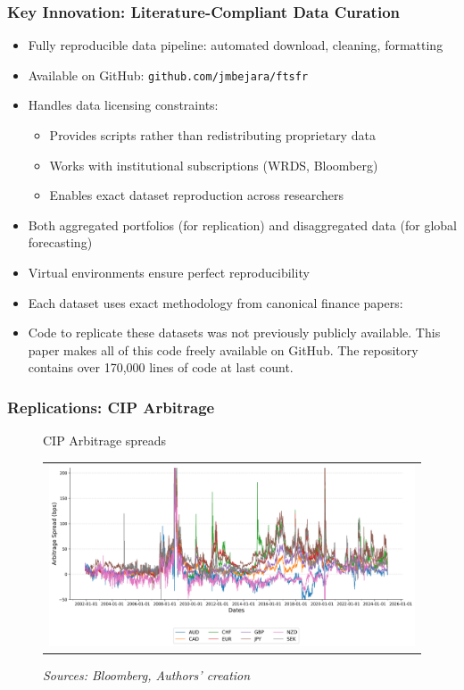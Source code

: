 \documentclass[ignorenonframetext, 9pt]{beamer}
\begin{document}
 \begin{frame}
    \frametitle{Key Innovation: Literature-Compliant Data Curation}
    \begin{itemize}
    \item \alert{Fully reproducible} data pipeline: automated download, cleaning, formatting
    \item Available on GitHub: \texttt{github.com/jmbejara/ftsfr}
    \item Handles data licensing constraints:
    \begin{itemize}
        \item Provides scripts rather than redistributing proprietary data
        \item Works with institutional subscriptions (WRDS, Bloomberg)
        \item Enables exact dataset reproduction across researchers
    \end{itemize}
    \item Both \alert{aggregated portfolios} (for replication) and \alert{disaggregated data} (for global forecasting)
    \item Virtual environments ensure perfect reproducibility
    \item Each dataset uses exact methodology from canonical finance papers:
    \item Code to replicate these datasets was not previously publicly available. This paper makes all of this
    code freely available on GitHub. The repository contains over 170,000 lines of code at last count.
    \end{itemize}
  \end{frame}
  


\begin{frame}
    \frametitle{Replications: CIP Arbitrage}
    \begin{figure}[h!]
        \centering
        \caption{CIP Arbitrage spreads}
      \begin{tabular}{@{}c@{}}
        \includegraphics[width=.95\linewidth]{../docs_src/CIP_replicate.png}
      \end{tabular}
      \caption*{\emph{Sources: Bloomberg, Authors' creation}}
      \label{fig:cip_basis}
    \end{figure}
\end{frame}
\end{document}
